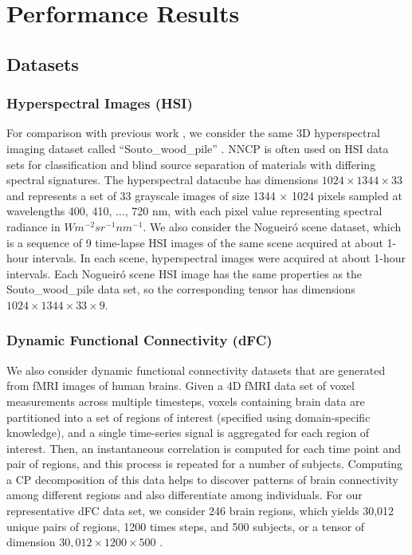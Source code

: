 
\section{Performance Results} \label{sec:experiments}



\subsection{Datasets}

\subsubsection{Hyperspectral Images (HSI)}
For comparison with previous work \cite{LK+17b}, we consider the same 3D hyperspectral imaging dataset called ``Souto\_wood\_pile'' \cite{FAN16}. 
NNCP is often used on HSI data sets for classification and blind source separation of materials with differing spectral signatures.
The hyperspectral datacube has dimensions $1024 \times 1344 \times 33$ and represents a set of 33 grayscale images of size 1344 $\times$ 1024 pixels sampled at wavelengths 400, 410, $\dots$, 720 nm, with each pixel value representing spectral radiance in $W m^{-2} sr^{-1} nm^{-1}$. 
We also consider the Nogueir\'{o} scene dataset, which is a sequence of 9 time-lapse HSI images of the same scene acquired at about 1-hour intervals.
In each scene, hyperspectral images were acquired at about 1-hour intervals. 
Each Nogueir\'{o} scene HSI image has the same properties as the Souto\_wood\_pile data set, so the corresponding tensor has dimensions $1024 \times 1344 \times 33 \times 9$. 

\subsubsection{Dynamic Functional Connectivity (dFC)}
We also consider dynamic functional connectivity datasets that are generated from fMRI images of human brains.
Given a 4D fMRI data set of voxel measurements across multiple timesteps, voxels containing brain data are partitioned into a set of regions of interest (specified using domain-specific knowledge), and a single time-series signal is aggregated for each region of interest.
Then, an instantaneous correlation is computed for each time point and pair of regions, and this process is repeated for a number of subjects.
Computing a CP decomposition of this data helps to discover patterns of brain connectivity among different regions and also differentiate among individuals.
For our representative dFC data set, we consider 246 brain regions, which yields 30{,}012 unique pairs of regions, 1200 times steps, and 500 subjects, or a tensor of dimension $30{,}012\times 1200 \times 500$ \cite{VEU+12,THBGW17}.

